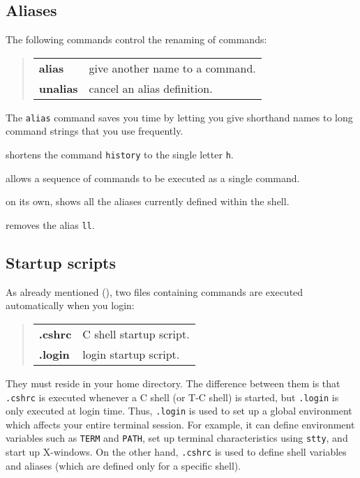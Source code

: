 \subsection{Aliases\label{alias}}

The following commands control the renaming of commands:
\begin{quote}
\begin{tabular}{lp{67mm}}

{\bf alias}   & give another name to a command.\\
{\bf unalias} & cancel an alias definition.

\end{tabular}
\end{quote}

The {\tt alias} command saves you time by letting you give shorthand names to
long command strings that you use frequently.

\goodbreak

\exbegin

{shortens the command {\tt history} to the single letter {\tt h}.}

{allows a sequence of commands to be executed as a single command.}

{on its own, shows all the aliases currently defined within the shell.}

{removes the alias {\tt ll}.}

\exend

\subsection{Startup scripts\label{ss1}}

As already mentioned (),
two files containing commands are executed automatically when you login:
\begin{quote}
\begin{tabular}{lp{67mm}}

{\bf .cshrc}  & C shell startup script.\\
{\bf .login}  & login startup script.

\end{tabular}
\end{quote}

They must reside in your home directory.
The difference between them is that {\tt .cshrc} is executed whenever a C shell
(or T-C shell) is started, but {\tt .login} is only executed at login time.
Thus, {\tt .login} is used to set up a global environment which affects your
entire terminal session.
For example, it can define environment variables such as {\tt TERM} and
{\tt PATH}, set up terminal characteristics using {\tt stty}, and start up
X-windows.
On the other hand, {\tt .cshrc} is used to define shell variables and aliases
(which are defined only for a specific shell).

